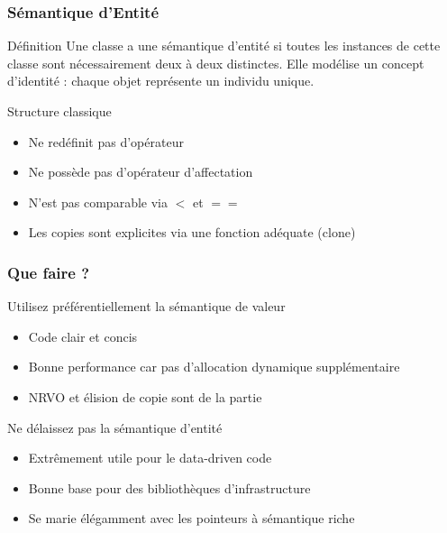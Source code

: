 \documentclass[svgnames]{beamer}
\begin{document}
\frame
{
 \frametitle{Sémantique d'Entité }
  \begin{block}{Définition}
Une classe a une sémantique d'entité si toutes les instances de
cette classe sont nécessairement deux à deux distinctes. Elle modélise 
un concept d'identité : chaque objet représente un individu unique.
  \end{block}

  \begin{block}{Structure classique}
  \begin{itemize}
  \footnotesize
  \item Ne redéfinit pas d'opérateur
  \item Ne possède pas d'opérateur d'affectation
  \item N'est pas comparable via $<$ et $==$
  \item Les copies sont explicites via une fonction adéquate (clone)
  \end{itemize}
  \end{block}
}

\frame
{
 \frametitle{Que faire ?}
  \begin{block}{Utilisez préférentiellement la sémantique de valeur}
  \begin{itemize}
  \footnotesize
  \item Code clair et concis
  \item Bonne performance car pas d'allocation dynamique supplémentaire
  \item NRVO et élision de copie sont de la partie
  \end{itemize}
  \end{block}

  \begin{block}{Ne délaissez pas la sémantique d'entité}
  \begin{itemize}
  \footnotesize
  \item Extrêmement utile pour le data-driven code
  \item Bonne base pour des bibliothèques d'infrastructure
  \item Se marie élégamment avec les pointeurs à sémantique riche
  \end{itemize}
  \end{block}
}
\end{document}
